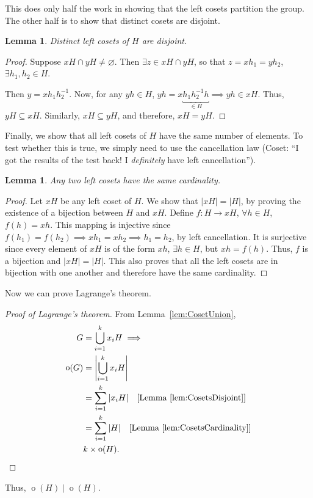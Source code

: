 \documentclass[svgnames]{article}
\newtheorem{Lemma}[Theorem]{Lemma}
\theoremstyle{definition}
\theoremstyle{remark}
\DeclareMathOperator{\ord}{o}
\begin{document}
This does only half the work in showing that the left cosets partition the group. The other half is to show that distinct cosets are disjoint.
\begin{Lemma}\label{lem:CosetsDisjoint}
Distinct left cosets of $H$ are disjoint.
\end{Lemma}
\begin{proof}
Suppose $xH \cap yH \ne \varnothing$. Then $\exists z \in xH \cap yH$, so that $z = xh_1 = yh_2$, $\exists h_1, h_2 \in H$.

Then $y = xh_1 h_2^{-1}$. Now, for any $yh \in H$, $yh = x \underbracket{h_1h_2^{-1}h}_{\in H} \implies yh \in xH$. Thus, $yH \subseteq xH$. Similarly, $xH \subseteq yH$, and therefore, $xH = yH$.
\end{proof}

Finally, we show that all left cosets of $H$ have the same number of elements. To test whether this is true, we simply need to use the cancellation law (Coset: ``I got the results of the test back! I \emph{definitely} have left cancellation'').

\begin{Lemma}\label{lem:CosetsCardinality}
Any two left cosets have the same cardinality.
\end{Lemma}
\begin{proof}
Let $xH$ be any left coset of $H$. We show that $|xH| = |H|$, by proving the existence of a bijection between $H$ and $xH$. Define $f \colon H \to xH$, $\forall h \in H$, $f(h) = xh$. This mapping is injective since $f(h_1) = f(h_2) \implies xh_1 = xh_2 \implies h_1 = h_2$, by left cancellation. It is surjective since every element of $xH$ is of the form $xh$, $\exists h \in H$, but $xh = f(h)$. Thus, $f$ is a bijection and $|xH| = |H|$. This also proves that all the left cosets are in bijection with one another and therefore have the same cardinality.
\end{proof}

Now we can prove Lagrange's theorem.
\begin{proof}[Proof of Lagrange's theorem]
From Lemma~\ref{lem:CosetUnion},
\begin{align*}
G &= \bigcup_{i = 1}^k x_i H \implies \\
\ord(G) &= \left| \bigcup_{i = 1}^k x_i H \right| \\
	&= \sum_{i = 1}^k |x_i H| \quad \text{[Lemma~\ref{lem:CosetsDisjoint}]} \\
	& = \sum_{i = 1}^k |H| \quad \text{[Lemma~\ref{lem:CosetsCardinality}]} \\
	& k \times \ord(H).
\end{align*}
\end{proof}
Thus, $\ord(H) \mid \ord(H)$.
\end{document}
